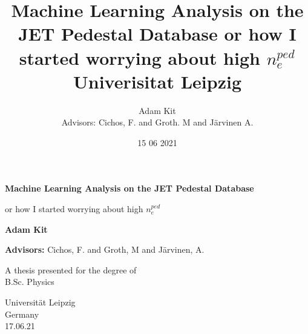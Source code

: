 \documentclass[a4paper, twoside, final, 12pt]{article}
\title{
	{Machine Learning Analysis on the JET Pedestal Database } \vspace{0.5cm}
	{\large or how I started worrying about high $n_e^{ped}$}\\
	{\large Univerisitat Leipzig} \\ 
	}
\author{Adam Kit \\{\small Advisors: Cichos, F. and Groth. M and Järvinen A.}}
\date{15 06 2021}
\begin{document}
\begin{titlepage}
   \begin{center}
       \vspace*{1cm}

       \textbf{Machine Learning Analysis on the JET Pedestal Database }

       \vspace{0.5cm}
        or how I started worrying about high $n_e^{ped}$
            
       \vspace{1.5cm}

       \textbf{Adam Kit}
       
       \vspace{0.5cm}
       \textbf{Advisors:} Cichos, F. and Groth, M and Järvinen, A.

       \vfill
            
       A thesis presented for the degree of\\
       B.Sc. Physics
            
       \vspace{0.8cm}
     
            
       Universität Leipzig\\
       Germany\\
       17.06.21
            
   \end{center}
\end{titlepage}
    \newpage
    \tableofcontents
    \newpage
\end{document}

